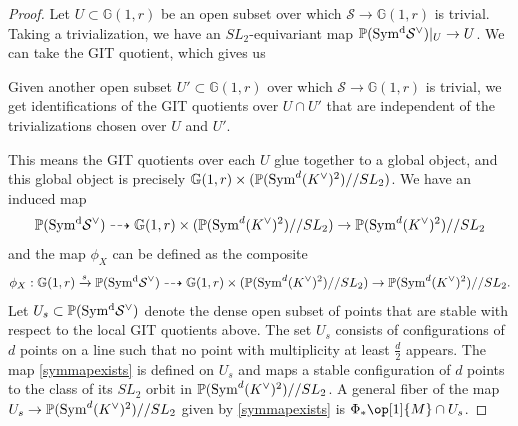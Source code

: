 \documentclass[12pt]{amsart}
\newcommand{\mb}{\mathbb}
\newcommand{\mc}{\mathcal}
\theoremstyle{plain}
\theoremstyle{definition}
\theoremstyle{remark}
\begin{document}
\begin{proof}
Let $U\subset \mb{G}(1,r)$ be an open subset over which $\mc{S}\to \mb{G}(1,r)$ is trivial. Taking a trivialization, we have an $SL_{2}$-equivariant map $\mb{P}({\rm Sym^d} \mc{S}^{\vee})|_{U}\to U$. We can take the GIT quotient, which gives us
\begin{center}
\end{center}
Given another open subset $U'\subset \mb{G}(1,r)$ over which $\mc{S}\to \mb{G}(1,r)$ is trivial, we get identifications of the GIT quotients over $U\cap U'$ that are independent of the trivializations chosen over $U$ and $U'$.
\begin{center}
\end{center}
This means the GIT quotients over each $U$ glue together to a global object, and this global object is precisely $\mb{G}(1,r)\times (\mb{P}({\rm Sym}^d (K^{\vee})^2)//SL_{2})$. We have an induced map
\begin{align}\label{symmapexists}
\mb{P}({\rm Sym^d} \mc{S}^{\vee})\dashrightarrow \mb{G}(1,r)\times (\mb{P}({\rm Sym}^d (K^{\vee})^2)//SL_{2})\to \mb{P}({\rm Sym}^d (K^{\vee})^2)//SL_{2}
\end{align}
and the map $\phi_X$ can be defined as the composite
\begin{align*}
\phi_X:\mb{G}(1,r)\xrightarrow{s} \mb{P}({\rm Sym^d} \mc{S}^{\vee})\dashrightarrow \mb{G}(1,r)\times (\mb{P}({\rm Sym}^d (K^{\vee})^2)//SL_{2}) \to \mb{P}({\rm Sym}^d (K^{\vee})^2)//SL_{2}.
\end{align*}
Let $U_s\subset \mb{P}({\rm Sym^d} \mc{S}^{\vee})$ denote the dense open subset of points that are stable with respect to the local GIT quotients above. The set $U_s$ consists of configurations of $d$ points on a line such that no point with multiplicity at least $\frac{d}{2}$ appears. The map \eqref{symmapexists} is defined on $U_{s}$ and maps a stable configuration of $d$ points to the class of its $SL_2$ orbit in $\mb{P}({\rm Sym}^d (K^{\vee})^2)//SL_{2}$. A general fiber of the map $U_{s}\to \mb{P}({\rm Sym}^d (K^{\vee})^2)//SL_{2}$ given by \eqref{symmapexists} is $\Phi_*\op[1]{M}\cap U_{s}$. 


\end{proof}
\end{document}
